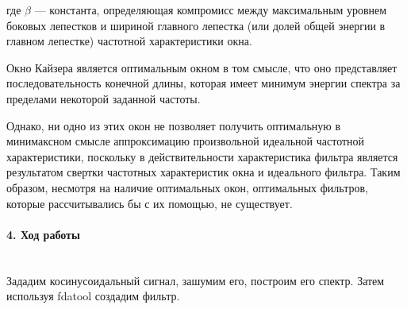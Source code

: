 \documentclass[12pt,a4paper]{report}
\begin{document}
где $\beta$ — константа, определяющая компромисс между максимальным уровнем боковых лепестков и шириной главного лепестка (или долей общей энергии в главном лепестке) частотной характеристики окна.

Окно Кайзера является оптимальным окном в том смысле, что оно представляет последовательность конечной длины, которая имеет минимум энергии спектра за пределами некоторой заданной частоты. 

Однако, ни одно из этих окон не позволяет получить оптимальную в минимаксном смысле аппроксимацию произвольной идеальной частотной характеристики, поскольку в действительности характеристика фильтра является результатом свертки частотных характеристик окна и идеального фильтра. Таким образом, несмотря на наличие оптимальных окон, оптимальных фильтров, которые рассчитывались бы с их помощью, не существует.

\paragraph{4. Ход работы \\\\}

Зададим косинусоидальный сигнал, зашумим его, построим его спектр. Затем используя fdatool создадим фильтр.
\end{document}
